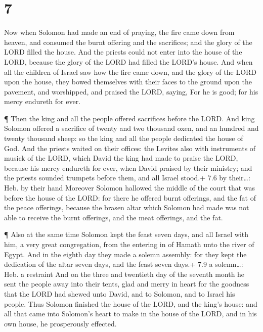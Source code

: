 \hypertarget{section-6}{%
\section{7}\label{section-6}}

 Now when Solomon had made an end of praying, the fire came
down from heaven, and consumed the burnt offering and the sacrifices;
and the glory of the LORD filled the house.  And the priests
could not enter into the house of the LORD, because the glory of the
LORD had filled the LORD's house.  And when all the children
of Israel saw how the fire came down, and the glory of the LORD upon the
house, they bowed themselves with their faces to the ground upon the
pavement, and worshipped, and praised the LORD, saying, For he is good;
for his mercy endureth for ever.

 ¶ Then the king and all the people offered sacrifices
before the LORD.  And king Solomon offered a sacrifice of
twenty and two thousand oxen, and an hundred and twenty thousand sheep:
so the king and all the people dedicated the house of God. 
And the priests waited on their offices: the Levites also with
instruments of musick of the LORD, which David the king had made to
praise the LORD, because his mercy endureth for ever, when David praised
by their ministry; and the priests sounded trumpets before them, and all
Israel stood.+ 7.6 by their\ldots: Heb. by their hand 
Moreover Solomon hallowed the middle of the court that was before the
house of the LORD: for there he offered burnt offerings, and the fat of
the peace offerings, because the brasen altar which Solomon had made was
not able to receive the burnt offerings, and the meat offerings, and the
fat.

 ¶ Also at the same time Solomon kept the feast seven days,
and all Israel with him, a very great congregation, from the entering in
of Hamath unto the river of Egypt.  And in the eighth day
they made a solemn assembly: for they kept the dedication of the altar
seven days, and the feast seven days.+ 7.9 a solemn\ldots: Heb. a
restraint  And on the three and twentieth day of the
seventh month he sent the people away into their tents, glad and merry
in heart for the goodness that the LORD had shewed unto David, and to
Solomon, and to Israel his people.  Thus Solomon finished
the house of the LORD, and the king's house: and all that came into
Solomon's heart to make in the house of the LORD, and in his own house,
he prosperously effected.

